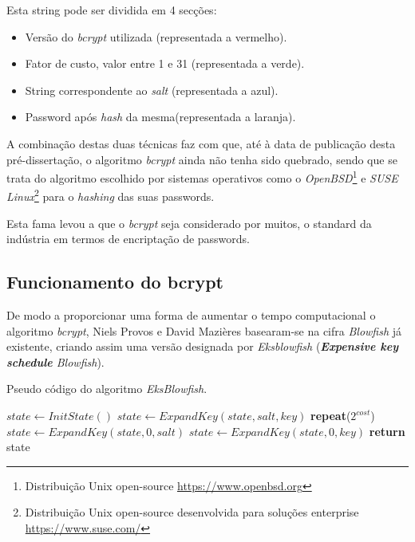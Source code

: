 Esta string pode ser dividida em 4 secções:

\begin{itemize}
    \item Versão do \emph{bcrypt} utilizada (representada a vermelho).
    \item Fator de custo, valor entre 1 e 31 (representada a verde).
    \item String correspondente ao \emph{salt} (representada a azul).
    \item Password após \emph{hash} da mesma(representada a laranja).
\end{itemize}

A combinação destas duas técnicas faz com que, até à data de publicação desta pré-dissertação, o algoritmo \emph{bcrypt} ainda não tenha sido quebrado, sendo que se trata do algoritmo escolhido por sistemas operativos como o \emph{OpenBSD}\footnote{Distribuição Unix open-source \url{https://www.openbsd.org}} e \emph{SUSE Linux}\footnote{Distribuição Unix open-source desenvolvida para soluções enterprise \url{https://www.suse.com/}} para o \emph{hashing} das suas passwords.

Esta fama levou a que o \emph{bcrypt} seja considerado por muitos, o standard da indústria em termos de encriptação de passwords.

\subsection{Funcionamento do bcrypt}

De modo a proporcionar uma forma de aumentar o tempo computacional o algoritmo \emph{bcrypt}, Niels Provos e David Mazières basearam-se na cifra \emph{Blowfish} já existente, criando assim uma versão designada por \emph{Eksblowfish} (\textit{\textbf{Expensive key schedule} Blowfish}).

\begin{algorithm}
    \caption{Pseudo código do algoritmo \emph{EksBlowfish}.}
    \begin{algorithmic}[1]
        \State $state\gets InitState()$
        \State $state\gets ExpandKey(state, salt, key)$
        \State \textbf{repeat}($2^{cost}$)
        \State \indent $state\gets ExpandKey(state, 0, salt)$
        \State \indent $state\gets ExpandKey(state, 0, key)$
        \State \textbf{return} state
    \EndFunction
    \end{algorithmic}
\end{algorithm}

